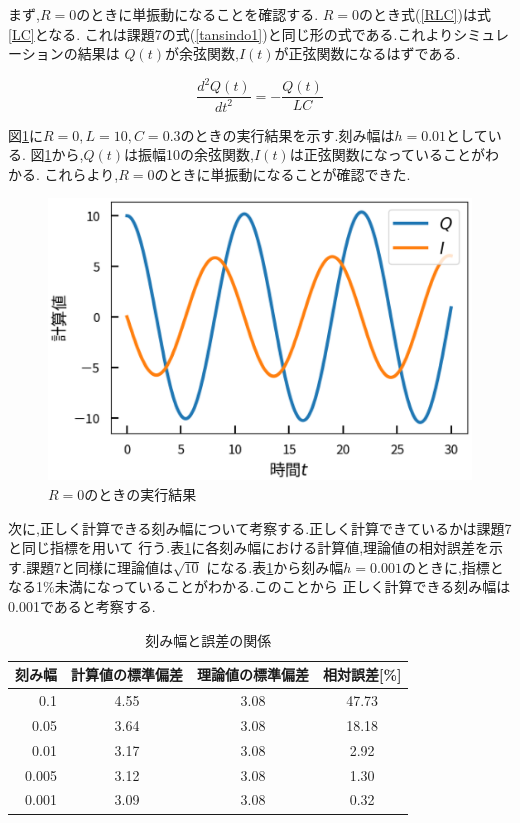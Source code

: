 \documentclass[a4j]{jarticle}
\begin{document}
        まず,$R=0$のときに単振動になることを確認する. $R=0$のとき式(\ref{RLC})は式\ref{LC}となる.
        これは課題7の式(\ref{tansindo1})と同じ形の式である.これよりシミュレーションの結果は
        $Q(t)$が余弦関数,$I(t)$が正弦関数になるはずである.
        
        \begin{equation}
          \frac{d^2Q(t)}{dt^2} =-\frac{Q(t)}{LC}
          \label{LC}
        \end{equation}

        図\ref{r0}に$R=0,L=10,C=0.3$のときの実行結果を示す.刻み幅は$h=0.01$としている.
        図\ref{r0}から,$Q(t)$は振幅10の余弦関数,$I(t)$は正弦関数になっていることがわかる.
        これらより,$R=0$のときに単振動になることが確認できた.
        
        \begin{figure}[H]
          \centering
          \includegraphics[scale=0.6]{r0.eps}
          \caption{$R=0$のときの実行結果}
          \label{r0}
          \end{figure}

        次に,正しく計算できる刻み幅について考察する.正しく計算できているかは課題7と同じ指標を用いて
        行う.表\ref{h8}に各刻み幅における計算値,理論値の相対誤差を示す.課題7と同様に理論値は$\sqrt{10}$
        になる.表\ref{h8}から刻み幅$h=0.001$のときに,指標となる1\%未満になっていることがわかる.このことから
        正しく計算できる刻み幅は0.001であると考察する.
        \begin{table}[H]
          \caption{刻み幅と誤差の関係}
          \label{h8}
          \begin{center}
          \begin{tabular}{r|c|c|c}\hline
            刻み幅 & 計算値の標準偏差 & 理論値の標準偏差 & 相対誤差[\%] \\ \hline \hline 
            0.1 & 4.55 & 3.08 & 47.73 \\
            0.05 & 3.64 & 3.08 & 18.18 \\
            0.01 & 3.17 & 3.08 & 2.92 \\
            0.005 & 3.12 & 3.08 & 1.30 \\
            0.001 & 3.09 & 3.08 & 0.32 \\ \hline
          \end{tabular}
          \end{center}
          \end{table}
\end{document}
